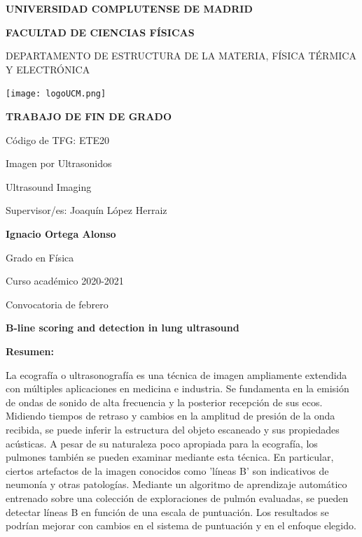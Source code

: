\documentclass[12pt]{article} %
\begin{document}
\begin{titlepage}
\centering
{ \bfseries \Large UNIVERSIDAD COMPLUTENSE DE MADRID}
\vspace{0.5cm}

{\bfseries  \Large FACULTAD DE CIENCIAS FÍSICAS} 
\vspace{1cm}

{\large DEPARTAMENTO DE ESTRUCTURA DE LA MATERIA, FÍSICA TÉRMICA Y ELECTRÓNICA}
\vspace{0.8cm}

{\texttt{[image: logoUCM.png]}} %
\vspace{0.8cm}

{\bfseries \Large TRABAJO DE FIN DE GRADO}
\vspace{15mm}

{\Large Código de TFG:  ETE20 } \vspace{5mm}

{\Large Imagen por Ultrasonidos}\vspace{5mm}

{\Large Ultrasound Imaging}\vspace{5mm}

{\Large Supervisor/es: Joaquín López Herraiz}\vspace{18mm} 

{\bfseries \LARGE Ignacio Ortega Alonso}\vspace{5mm} 

{\large Grado en Física}\vspace{5mm} 

{\large Curso acad\'emico 2020-2021}\vspace{5mm} 

{\large Convocatoria de febrero}\vspace{5mm} 

\end{titlepage}
\newpage

{\bfseries \large B-line scoring and detection in lung ultrasound }\vspace{10mm} 

{\bfseries \large Resumen:} \vspace{5mm}

La ecografía o ultrasonografía es una técnica de imagen ampliamente extendida con múltiples aplicaciones en medicina e industria. Se fundamenta en la emisión de ondas de sonido de alta frecuencia y la posterior recepción de sus ecos. Midiendo tiempos de retraso y cambios en la amplitud de presión de la onda recibida, se puede inferir la estructura del objeto escaneado y sus propiedades acústicas. A pesar de su naturaleza poco apropiada para la ecografía, los pulmones también se pueden examinar mediante esta técnica. En particular, ciertos artefactos de la imagen conocidos como 'líneas B' son indicativos de neumonía y otras patologías. Mediante un algoritmo de aprendizaje automático entrenado sobre una colección de exploraciones de pulmón evaluadas, se pueden detectar líneas B en función de una escala de puntuación. Los resultados se podrían mejorar con cambios en el sistema de puntuación y en el enfoque elegido.
\vspace{1cm}
\end{document}
